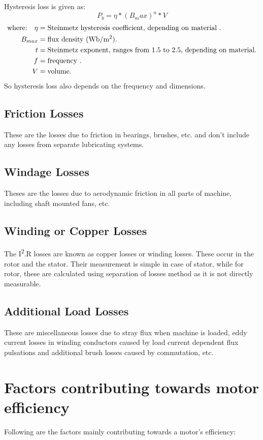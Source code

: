 Hysteresis loss is given as:
\begin{equation}
P_b= \eta * (B_max)^n * V
\end{equation}
\begin{align*}
\text{where:}\quad
 \eta    &=  \text{Steinmetz hysteresis coefficient, depending on material .} \\
 B_{max}    &=  \text{flux density (Wb/m\textsuperscript{2}).} \\
 t    &=  \text{Steinmetz exponent, ranges from 1.5 to 2.5, depending on material.} \\
 f    &=  \text{frequency .} \\
 V    &=  \text{volume.} \\
\end{align*}
So hysteresis loss also depends on the frequency and dimensions.

\subsection{Friction Losses}
These are the losses due to friction in bearings, brushes, etc. and don't include any losses from separate lubricating systems.

\subsection{Windage Losses}
Theses are the losses due to aerodynamic friction in all parts of machine, including shaft mounted fans, etc.

\subsection{Winding or Copper Losses}
The I\textsuperscript{2}.R losses are known as copper losses or winding losses. These occur in the rotor and the stator. Their measurement is simple in case of stator, while for rotor, these are calculated using separation of losses method as it is not directly measurable.

\subsection{Additional Load Losses}
These are miscellaneous losses due to stray flux when machine is loaded, eddy current losses in winding conductors caused by load current dependent flux pulsations and additional brush losses caused by commutation, etc.

\section{Factors contributing towards motor efficiency}
Following are the factors mainly contributing towards a motor's efficiency\cite{manoharan2009review}:


